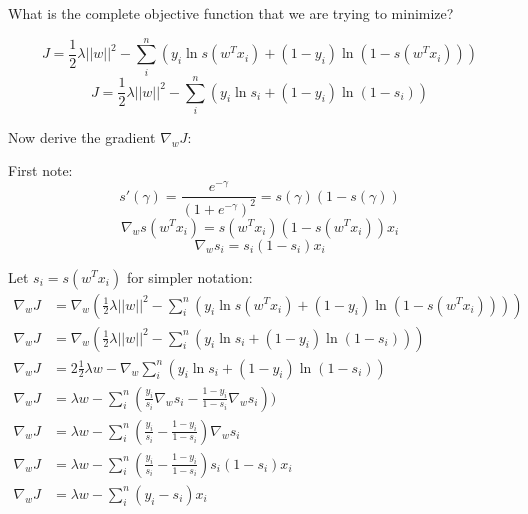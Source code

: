 \begin{Parts}
\Part What is the complete objective function that we are trying to minimize?

    \begin{solution}
    \begin{equation*}
            J = \frac{1}{2}\lambda||w||^2 -\sum_{i}^{n}(y_i\ln s(w^Tx_i) + (1-y_i) \ln(1 - s(w^Tx_i)))
    \end{equation*}
    \begin{equation*}
            J = \frac{1}{2}\lambda||w||^2 -\sum_{i}^{n}(y_i\ln s_i + (1-y_i) \ln(1 - s_i))
    \end{equation*}
\end{solution}
    
\Part Now derive the gradient $\nabla_wJ$:

    \begin{solution}
    First note:
    \begin{equation*}
            s'(\gamma) = \frac{e^{-\gamma}}{(1+e^{-\gamma})^2} = s(\gamma)(1 - s(\gamma))
    \end{equation*}
    \begin{equation*}
            \nabla_w s(w^Tx_i) = s(w^Tx_i)(1 - s(w^Tx_i))x_i
    \end{equation*}
    \begin{equation*}
            \nabla_w s_i = s_i(1 - s_i)x_i
    \end{equation*}
    
    Let $s_i = s(w^Tx_i)$ for simpler notation:
    \begin{align*}
            \nabla_w J &= \nabla_w (\frac{1}{2}\lambda||w||^2 -\sum_{i}^{n}(y_i\ln s(w^Tx_i) + (1-y_i) \ln(1 - s(w^Tx_i)))) \\
            \nabla_w J &= \nabla_w (\frac{1}{2}\lambda||w||^2 -\sum_{i}^{n}(y_i\ln s_i + (1-y_i) \ln(1 - s_i))) \\
            \nabla_w J &= 2 \frac{1}{2}\lambda w -\nabla_w \sum_{i}^{n}(y_i\ln s_i + (1-y_i) \ln(1 - s_i)) \\
            \nabla_w J &= \lambda w - \sum_{i}^{n}(\frac{y_i}{s_i} \nabla_w s_i - \frac{1-y_i}{1-s_i} \nabla_w s_i)) \\
            \nabla_w J &= \lambda w - \sum_{i}^{n}(\frac{y_i}{s_i} - \frac{1-y_i}{1-s_i}) \nabla_w s_i \\
            \nabla_w J &= \lambda w - \sum_{i}^{n}(\frac{y_i}{s_i} - \frac{1-y_i}{1-s_i}) s_i(1 - s_i)x_i \\
            \nabla_w J &= \lambda w - \sum_{i}^{n}(y_i - s_i)x_i
    \end{align*}
\end{solution}


\end{Parts}
